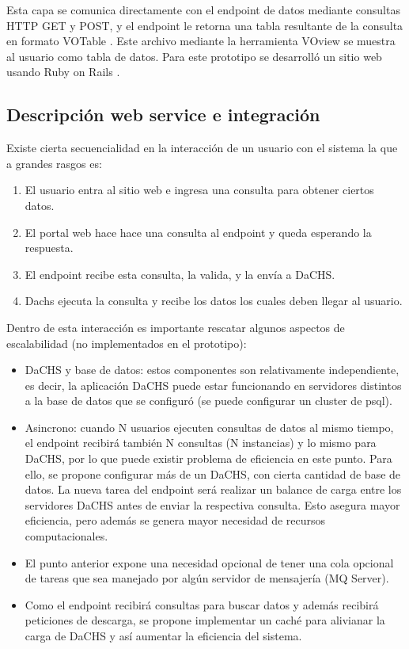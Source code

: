 Esta capa se comunica directamente con el endpoint de datos mediante consultas
HTTP GET y POST, y el endpoint le retorna una tabla resultante de la consulta
en formato VOTable \cite{votable}. Este archivo mediante la herramienta VOview
\cite{voview} se muestra al usuario como tabla de datos.  Para este prototipo
se desarrolló un sitio web usando Ruby on Rails \cite{ror}.

\subsection{Descripción web service e integración}
Existe cierta secuencialidad en la interacción de un usuario con el sistema la que a grandes rasgos es:
\begin{enumerate}
	\item El usuario entra al sitio web e ingresa una consulta para obtener ciertos datos.
	\item El portal web hace hace una consulta al endpoint y queda esperando la respuesta.
	\item El endpoint recibe esta consulta, la valida, y la envía a DaCHS.
	\item Dachs ejecuta la consulta y recibe los datos los cuales deben llegar al usuario.
\end{enumerate}

Dentro de esta interacción es importante rescatar algunos aspectos de
escalabilidad (no implementados en el prototipo):
\begin{itemize}
	\item DaCHS y base de datos: estos componentes son relativamente
independiente, es decir, la aplicación DaCHS puede estar funcionando en
servidores distintos a la base de datos que se configuró (se puede configurar
un cluster de psql).
	\item Asincrono: cuando N usuarios ejecuten consultas de datos al mismo
tiempo, el endpoint recibirá también N consultas (N instancias) y lo mismo para
DaCHS, por lo que puede existir problema de eficiencia en este punto. Para
ello, se propone configurar más de un DaCHS, con cierta cantidad de base de
datos. La nueva tarea del endpoint será realizar un balance de carga entre los
servidores DaCHS antes de enviar la respectiva consulta. Esto asegura mayor
eficiencia, pero además se genera mayor necesidad de recursos computacionales.
	\item El punto anterior expone una necesidad opcional de tener una cola
opcional de tareas que sea manejado por algún servidor de mensajería (MQ
Server).
	\item Como el endpoint recibirá consultas para buscar datos y además
recibirá peticiones de descarga, se propone implementar un caché para alivianar
la carga de DaCHS y así aumentar la eficiencia del sistema.
\end{itemize}

